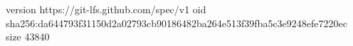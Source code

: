 version https://git-lfs.github.com/spec/v1
oid sha256:da644793f31150d2a02793cb90186482ba264e513f39fba5c3e9248efe7220ec
size 43840
